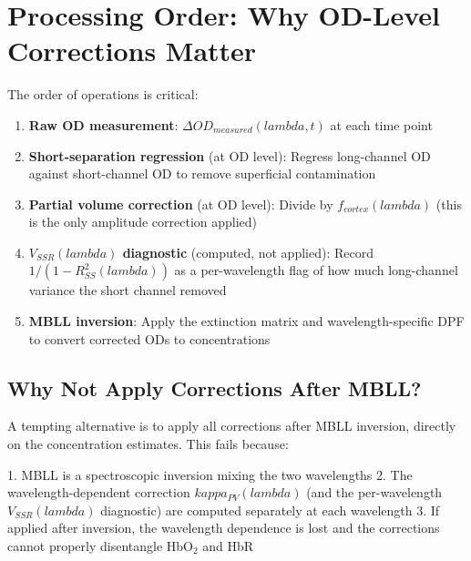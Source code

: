 \documentclass[12pt]{article}
\def\kappa{kappa}%
\def\lambda{lambda}%
\def\mathrm#1{#1}%
\def\text#1{#1}%
\begin{document}
\section{Processing Order: Why OD-Level Corrections Matter}
\label{sec:order}

The order of operations is critical:

\begin{enumerate}
\item \textbf{Raw OD measurement}: $\Delta\text{OD}_{\text{measured}}(\lambda, t)$ at each time point
\item \textbf{Short-separation regression} (at OD level): Regress long-channel OD against short-channel OD to remove superficial contamination
\item \textbf{Partial volume correction} (at OD level): Divide by $f_{\text{cortex}}(\lambda)$ (this is the only amplitude correction applied)
\item \textbf{$V_{\mathrm{SSR}}(\lambda)$ diagnostic} (computed, not applied): Record $1/(1-R^2_{\mathrm{SS}}(\lambda))$ as a per-wavelength flag of how much long-channel variance the short channel removed
\item \textbf{MBLL inversion}: Apply the extinction matrix and wavelength-specific DPF to convert corrected ODs to concentrations
\end{enumerate}

\subsection{Why Not Apply Corrections After MBLL?}

A tempting alternative is to apply all corrections after MBLL inversion, directly on the concentration estimates. This fails because:

1. MBLL is a spectroscopic inversion mixing the two wavelengths
2. The wavelength-dependent correction $\kappa_{\text{PV}}(\lambda)$ (and the per-wavelength $V_{\mathrm{SSR}}(\lambda)$ diagnostic) are computed separately at each wavelength
3. If applied after inversion, the wavelength dependence is lost and the corrections cannot properly disentangle HbO$_2$ and HbR
\end{document}
